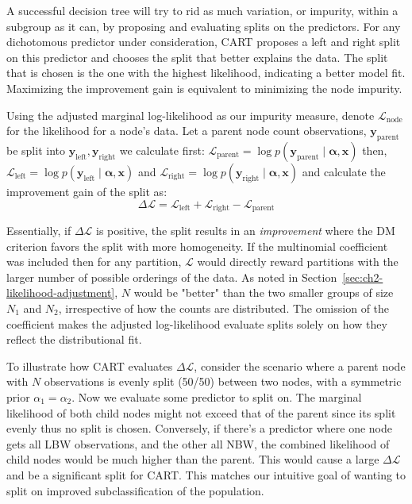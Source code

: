 A successful decision tree will try to rid as much variation, or impurity, within a subgroup as it can, by proposing and evaluating splits on the predictors. For any dichotomous predictor under consideration, CART proposes a left and right split on this predictor and chooses the split that better explains the data. The split that is chosen is the one with the highest likelihood, indicating a better model fit. Maximizing the improvement gain is equivalent to minimizing the node impurity.

Using the adjusted marginal log-likelihood as our impurity measure, denote \(\mathcal{L}_{\text{node}}\) for the likelihood for a node's data. Let a parent node count observations, \(\mathbf{y}_{\text{parent}}\) be split into  \(\mathbf{y}_{\text{left}},\mathbf{y}_{\text{right}}\)  we calculate first: \( 
    \mathcal{L}_{\text{parent}} = \log p(\mathbf{y}_{\text{parent}} \mid \boldsymbol{\alpha}, \mathbf{x})
\) then, 
\(
    \mathcal{L}_{\text{left}} = \log p(\mathbf{y}_{\text{left}} \mid \boldsymbol{\alpha},\mathbf{x})
\)
and 
\(
    \mathcal{L}_{\text{right}} = \log p(\mathbf{y}_{\text{right}} \mid \boldsymbol{\alpha},\mathbf{x})
\) and calculate the improvement gain of the split as: 
\[
    \Delta \mathcal{L} = \mathcal{L}_{\text{left}} + \mathcal{L}_{\text{right}} - \mathcal{L}_{\text{parent}}
\]

Essentially, if \(\Delta\mathcal{L}\) is positive, the split results in an \emph{improvement} where the DM criterion favors the split with more homogeneity. If the multinomial coefficient was included then for any partition, \(\mathcal{L}\) would directly reward partitions with the larger number of possible orderings of the data. As noted in Section~\ref{sec:ch2-likelihood-adjustment}, \(N\) would be "better" than the two smaller groups of size \(N_1\) and \(N_2\), irrespective of how the counts are distributed. The omission of the coefficient makes the adjusted log-likelihood evaluate splits solely on how they reflect the distributional fit. 

To illustrate how CART evaluates \(\Delta\mathcal{L}\), consider the scenario where a parent node with \(N\) observations is evenly split (50/50) between two nodes, with a symmetric prior \(\alpha_1 = \alpha_2\). Now we evaluate some predictor to split on. The marginal likelihood of both child nodes might not exceed that of the parent since its split evenly thus no split is chosen. Conversely, if there's a predictor where one node gets all LBW observations, and the other all NBW, the combined likelihood of child nodes would be much higher than the parent. This would cause a large \(\Delta\mathcal{L}\) and be a significant split for CART. This matches our intuitive goal of wanting to split on improved subclassification of the population.